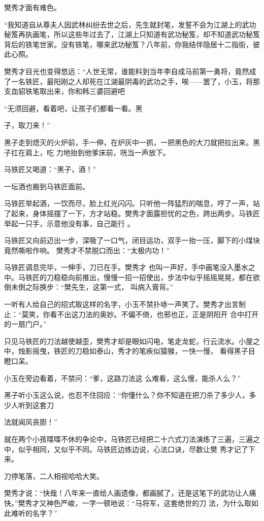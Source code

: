 \documentclass{article}
\begin{document}
樊秀才面有难色。 

“我知道自从尊夫人因武林纠纷去世之后，先生就封笔，发誓不会为江湖上的武功秘笈再执画笔，所以这些年过去了，江湖上只知道有武功秘笈，却不知道武功秘笈背后的铁笔世家。没有铁笔，哪来武功秘笈？八年前，你我结伴隐居十二指街，彼此心照。

樊秀才目光也变得悠远：“人世无常，谁能料到当年李自成马前第一勇将，竟然成了一名铁匠，最阳刚之人却死在江湖最阴毒的武功之手，唉——罢了，小玉，将那支血貂铁笔取出来，你和韩三婆回避吧

“无须回避，看着吧，让孩子们都看一看。黑
\newpage

子，取刀来！” 

黑子走到熄灭的火炉前，手一伸，在炉灰中一抓，一把黑色的大刀就把拉出来。黑子扛在肩上，吃
力地抬到他爹床前，咣当一声放下。 


马铁匠又喝道：“黑子，酒！” 


一坛酒也搬到马铁匠面前。 

马铁匠举起酒，一饮而尽，脸上红光闪闪。只听他一阵猛烈的喘息，哼了一声，站了起来，身体摇摆了一下，方才站稳。樊秀才面露担忧的之色，跨出两步。马铁匠举起一只手，示意他没有事，自己能行
。 

马铁匠又向前迈出一步，深吸了一口气，闭目运功，双手一抬一压，脚下的小煤块竟然嘶啦作响。
樊秀才不禁脱口而出：“太极内功！” 

马铁匠调息完毕，一伸手，刀已在手。樊秀才
\newpage
也叫一声好，手中画笔没入墨水之中。马铁匠的刀稳稳向前推出，慢慢一招一招使出，步法中似乎摇摇晃晃，都在欲倒未倒之际换步：“樊先生，这第一式，
叫病入膏肓。” 

一听有人给自己的招式取这样的名字，小玉不禁扑哧一声笑了。樊秀才出言制止：“莫笑，你看不出这刀法的奥妙。不偏不倚，也邪也正，正是阴阳开
合中打开的一扇门户。” 

只见马铁匠的刀法越使越歪，樊秀才却是眼如闪电，笔走龙蛇，行云流水。小屋之中，烛影摇曳，铁匠的刀稳如泰山，秀才的笔疾似猿猴，一快一慢，
看得黑子目瞪口呆。 

小玉在旁边看着，不禁问：“爹，这路刀法这
么难看，这么慢，能杀人么？” 

黑子听小玉这么说，也忍不住回应：“你懂什么？你不知道在把刀杀了多少人，多少人听到这套刀

\newpage
法就闻风丧胆！” 

就在两个小孩喋喋不休的争论中，马铁匠已经把二十六式刀法演练了三遍，三遍之中，似乎相同，又似乎不同。马铁匠边练边说，心法口诀，尽数让樊
秀才记了下来。 


刀停笔落，二人相视哈哈大笑。 

樊秀才说：“快哉！八年来一直给人画遗像，都画腻了，还是这笔下的武功让人痛快。”樊秀才又神色严峻，一字一顿地说：“马将军，这套绝世的刀
法，为什么取如此难听的名字？” 
\end{document}

